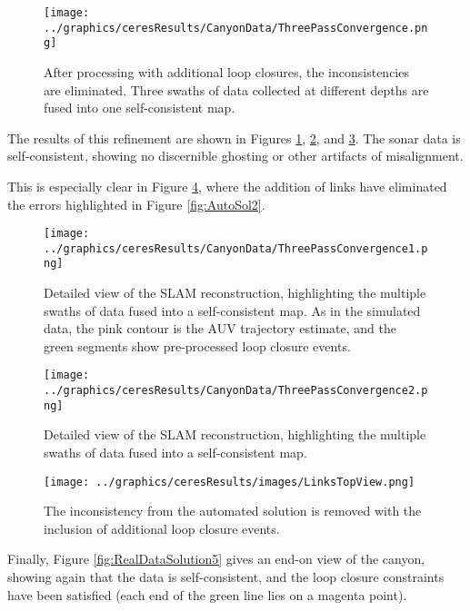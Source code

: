  \begin{figure}[!htb]
   \centering
   \texttt{[image: ../graphics/ceresResults/CanyonData/ThreePassConvergence.png]} %
   \caption{After processing with additional loop closures, the inconsistencies are eliminated. Three swaths of data collected at different depths are fused into one self-consistent map. }
   \label{fig:RealDataSolution1}
\end{figure}

The results of this refinement are shown in Figures \ref{fig:RealDataSolution1}, \ref{fig:RealDataSolution2}, and \ref{fig:RealDataSolution3}. The sonar data is self-consistent, showing no discernible ghosting or other artifacts of misalignment.

This is especially clear in Figure \ref{fig:RealDataSolution4}, where the addition of links have eliminated the errors highlighted in Figure \ref{fig:AutoSol2}.


 \begin{figure}[!htb]
   \centering
   \texttt{[image: ../graphics/ceresResults/CanyonData/ThreePassConvergence1.png]} %
   \caption{Detailed view of the SLAM reconstruction, highlighting the multiple swaths of data fused into a self-consistent map. As in the simulated data, the pink contour is the AUV trajectory estimate, and the green segments show pre-processed loop closure events. }
   \label{fig:RealDataSolution2}
\end{figure}

 \begin{figure}[!htb]
   \centering
   \texttt{[image: ../graphics/ceresResults/CanyonData/ThreePassConvergence2.png]} %
   \caption{Detailed view of the SLAM reconstruction, highlighting the multiple swaths of data fused into a self-consistent map. }
   \label{fig:RealDataSolution3}
\end{figure}

 \begin{figure}[!htb]
   \centering
   \texttt{[image: ../graphics/ceresResults/images/LinksTopView.png]} %
   \caption{The inconsistency from the automated solution is removed with the inclusion of additional loop closure events.}
   \label{fig:RealDataSolution4}
\end{figure}

Finally, Figure \ref{fig:RealDataSolution5} gives an end-on view of the canyon, showing again that the data is self-consistent, and the loop closure constraints have been satisfied (each end of the green line lies on a magenta point).


